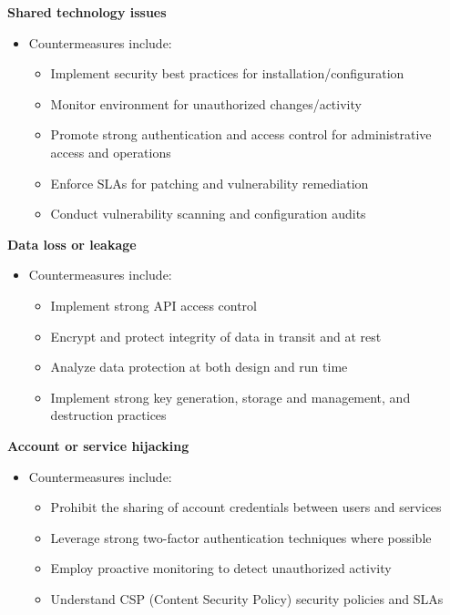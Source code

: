 \textbf{Shared technology issues}
\begin{itemize}
    \item Countermeasures include:
    \begin{itemize}
        \item Implement security best practices for installation/configuration
        \item Monitor environment for unauthorized changes/activity
        \item Promote strong authentication and access control for administrative access and operations
        \item Enforce SLAs for patching and vulnerability remediation
        \item Conduct vulnerability scanning and configuration audits\\
    \end{itemize}
\end{itemize}

\textbf{Data loss or leakage}
\begin{itemize}
    \item Countermeasures include:
    \begin{itemize}
        \item Implement strong API access control
        \item Encrypt and protect integrity of data in transit and at rest
        \item Analyze data protection at both design and run time
        \item Implement strong key generation, storage and management, and destruction practices\\
    \end{itemize}
\end{itemize}

\textbf{Account or service hijacking}
\begin{itemize}
    \item Countermeasures include:
    \begin{itemize}
        \item Prohibit the sharing of account credentials between users and services
        \item Leverage strong two-factor authentication techniques where possible
        \item Employ proactive monitoring to detect unauthorized activity
        \item Understand CSP (Content Security Policy) security policies and SLAs\\
    \end{itemize}
\end{itemize}

